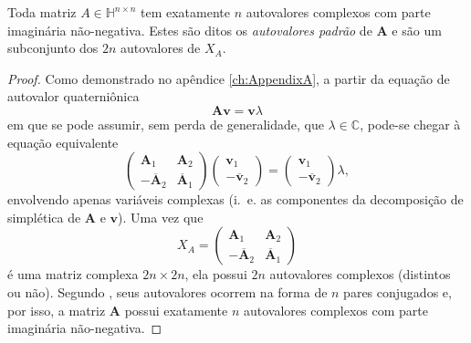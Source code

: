 \begin{theorem}
\label{th:02}
Toda matriz $ A \in \mathbb{H}^{n \times n} $ tem exatamente $ n $ autovalores complexos
com parte imagin\'aria n\~ao-negativa. Estes s\~ao ditos os \emph{autovalores padr\~ao} de $ \mathbf{A} $ e s\~ao um subconjunto dos $ 2n $ autovalores de $ X_A $.
\end{theorem}

\begin{proof}
Como demonstrado no ap\^endice \ref{ch:AppendixA}, a partir da equa\c c\~ao de autovalor quaterni\^onica
\begin{equation}
\mathbf{A} \mathbf{v} = \mathbf{v} \lambda
\end{equation}
em que se pode assumir, sem perda de generalidade, que $ \lambda \in \mathbb{C} $, pode-se chegar \`a equa\c c\~ao equivalente
\begin{equation}
\begin{pmatrix}
\mathbf{A}_1 & \mathbf{A}_2\\ 
- \overline{\mathbf{A}}_2 & \overline{\mathbf{A}}_1
\end{pmatrix}
\begin{pmatrix}
\mathbf{v}_1 \\ 
- \overline{\mathbf{v}}_2
\end{pmatrix} =
\begin{pmatrix}
\mathbf{v}_1 \\ 
- \overline{\mathbf{v}}_2
\end{pmatrix}
\lambda,
\end{equation}
envolvendo apenas vari\'aveis complexas (i.~e. as componentes da decomposi\c c\~ao de simpl\'etica de $ \mathbf{A} $ e $ \mathbf{v} $). Uma vez que
\begin{equation}
X_A = 
\begin{pmatrix}
\mathbf{A}_1 & \mathbf{A}_2\\ 
- \overline{\mathbf{A}}_2 & \overline{\mathbf{A}}_1
\end{pmatrix}
\end{equation}
\'e uma matriz complexa $ 2n \times 2n $, ela possui $ 2n $ autovalores complexos (distintos ou não). Segundo \cite[Teorema 5]{lee1948eigenvalues}, seus autovalores ocorrem na forma de $ n $ pares conjugados e, por isso, a matriz $ \mathbf{A} $ possui exatamente $ n $ autovalores complexos com parte imagin\'aria n\~ao-negativa.


\end{proof}
